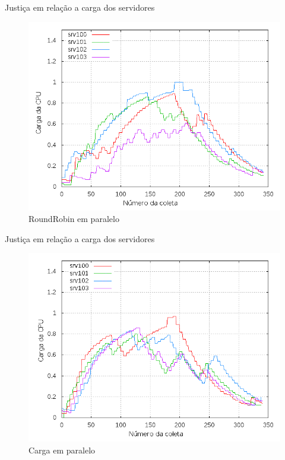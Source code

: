 \begin{frame}{Justiça em relação a carga dos servidores}
\begin{figure}[htb!]
    \centering
    \includegraphics[scale=0.35]{images/balancer-parallel-rr}
    \caption{RoundRobin em paralelo}
\end{figure}
\end{frame}


\begin{frame}{Justiça em relação a carga dos servidores}
\begin{figure}[htb!]
    \centering
    \includegraphics[scale=0.35]{images/balancer-parallel-load}
    \caption{Carga em paralelo}
\end{figure}

\end{frame}

